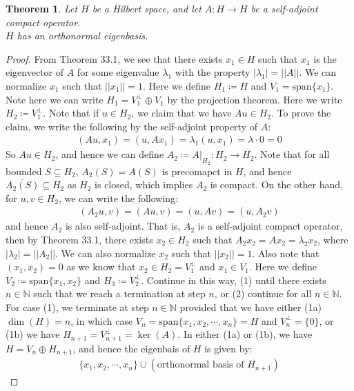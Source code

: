 \documentclass[11pt]{book}
\theoremstyle{break}
\theoremstyle{break}
\newtheorem{thm}{Theorem}[section]
\newcommand{\N}{\mathbb{N}}
\newcommand{\spa}{\text{span}}
\begin{document}
\begin{thm}
Let $H$ be a Hilbert space, and let $A:H \to H$ be a self-adjoint compact operator. \\
$H$ has an orthonormal eigenbasis.
\end{thm}
\begin{proof}
From Theorem 33.1, we see that there exists $x_1 \in H$ such that $x_1$ is the eigenvector of $A$ for some eigenvalue $\lambda_1$ with the property $|\lambda_1| = ||A||$. We can normalize $x_1$ such that $||x_1|| = 1$. Here we define $H_1 \coloneqq H$ and $V_1 = \spa\{x_1\}$. Note here we can write $H_1 = V_1^{\perp} \oplus V_1$ by the projection theorem. Here we write $H_2 \coloneqq V_1^{\perp}$. Note that if $u \in H_2$, we claim that we have $Au \in H_2$. To prove the claim, we write the following by the self-adjoint property of $A$:
\begin{align*}
(Au, x_1) = (u, Ax_1) = \lambda_1 (u,x_1) = \lambda \cdot 0 = 0
\end{align*}
So $Au \in H_2$, and hence we can define $A_2 \coloneqq A|_{H_2}:H_2 \to H_2$. Note that for all bounded $S \subseteq H_2$, $A_2(S) = A(S)$ is precomapct in $H$, and hence $\overline{A_2(S)} \subseteq H_2$ as $H_2$ is closed, which implies $A_2$ is compact. On the other hand, for $u,v \in H_2$, we can write the following:
\begin{align*}
(A_2u, v) = (Au,v) = (u,Av) = (u,A_2v)
\end{align*}   
and hence $A_2$ is also self-adjoint. That is, $A_2$ is a self-adjoint compact operator, then by Theorem 33.1, there exists $x_2 \in H_2$ such that $A_2 x_2  = Ax_2 = \lambda_2 x_2$, where $|\lambda_2| = ||A_2||$. We can also normalize $x_2$ such that $||x_2|| = 1$. Also note that $(x_1,x_2) = 0$ as we know that $x_2 \in H_2 = V_1^\perp$ and $x_1 \in V_1$. Here we define $V_2 \coloneqq \spa\{ x_1,x_2\}$ and $H_3 \coloneqq V_2^\perp$. Continue in this way, (1) until there exists $n\in \N$ such that we reach a termination at step $n$, or (2) continue for all $n \in \N$. For case (1), we terminate at step $n\in \N$ provided that we have either (1a) $\dim(H) = n$, in which case $V_n = \spa\{x_1,x_2,\cdots, x_n\} = H$ and $V_n^\perp = \{0\}$, or (1b) we have $H_{n+1} = V^{\perp}_{n+1} = \ker(A)$. In either (1a) or (1b), we have $H = V_n \oplus H_{n+1}$, and hence the eigenbais of $H$ is given by:
\begin{align*}
\{ x_1,x_2,\cdots, x_n\} \cup \left(\text{orthonormal basis of $H_{n+1}$} \right)
\end{align*}

\end{proof}
\end{document}

